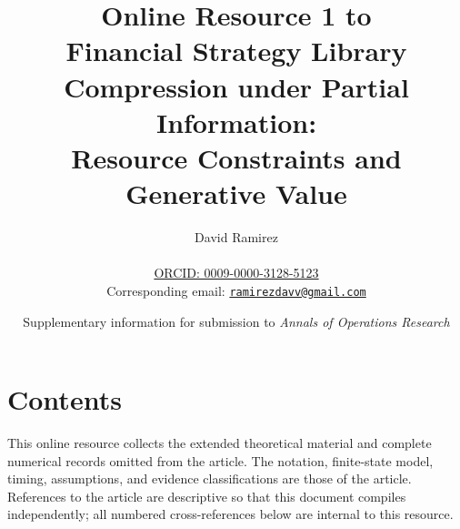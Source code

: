 \documentclass[11pt]{article}
\title{Online Resource 1 to\\
Financial Strategy Library Compression under Partial Information:\\
Resource Constraints and Generative Value}
\author{David Ramirez\\
\AORAffiliationDisplay\\
\href{https://orcid.org/0009-0000-3128-5123}{ORCID: 0009-0000-3128-5123}\\
Corresponding email: \href{mailto:ramirezdavv@gmail.com}{\texttt{ramirezdavv@gmail.com}}}
\date{Supplementary information for submission to \emph{Annals of Operations Research}}
\numberwithin{equation}{section}
\theoremstyle{definition}
\theoremstyle{plain}
\begin{document}
\maketitle
\thispagestyle{empty}
\clearpage

\section*{Contents}
\par\medskip
\makeatletter
{}
\makeatother
\clearpage

This online resource collects the extended theoretical material and complete
numerical records omitted from the article. The notation, finite-state model,
timing, assumptions, and evidence classifications are those of the article.
References to the article are descriptive so that this document compiles
independently; all numbered cross-references below are internal to this
resource.









\end{document}
